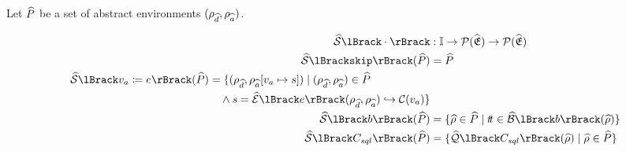 Let $\widehat{P}$ be a set of abstract environments $(\rho_{\widehat{d}}, \rho_{\widehat{a}})$.

\begin{align} \label{eq:abssemtype}
    \abssem{\cdot} &: \mathbb{I} \rightarrow \mathcal{P}(\ab{\mathfrak{E}}) \rightarrow \mathcal{P}(\ab{\mathfrak{E}}) \\
    \abssem{\texttt{skip}}(\ab{P}) &= \ab{P} \\
    \begin{split}
    \abssem{v_a \coloneqq e}(\ab{P}) &= \{(\env{\ab{d}}, \env{\absvars}[v_a \mapsto s]) \mid (\env{\ab{d}}, \env{\absvars}) \in \ab{P} \\
        & \quad \land s = \absexpsem{e}(\env{\ab{d}}, \env{\absvars}) \into \lookupcl(v_a) \}
    \end{split}\\
    \abssem{b}(\ab{P}) &= \{ \ab{\environment} \in \ab{P} \mid \true \in \absboolsem{b}(\ab{\environment}) \} \\
    \abssem{C_{sql}}(\ab{P}) &= \{\abssqlsem{C_{sql}}(\ab{\environment}) \mid \ab{\environment} \in \ab{P} \}
\end{align}


